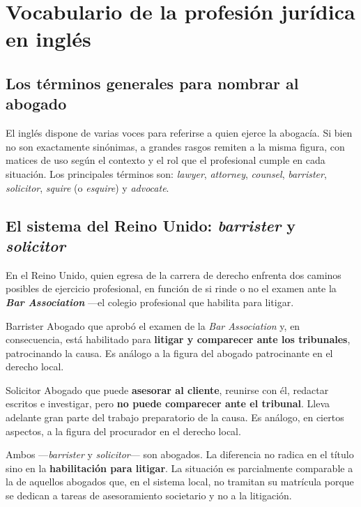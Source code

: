 \documentclass[12pt,oneside]{book}
\begin{document}
\chapter{Vocabulario de la profesión jurídica en inglés}

\section{Los términos generales para nombrar al abogado}

El inglés dispone de varias voces para referirse a quien ejerce la abogacía. Si bien no son exactamente sinónimas, a grandes rasgos remiten a la misma figura, con matices de uso según el contexto y el rol que el profesional cumple en cada situación. Los principales términos son: \textit{lawyer}, \textit{attorney}, \textit{counsel}, \textit{barrister}, \textit{solicitor}, \textit{squire} (o \textit{esquire}) y \textit{advocate}.

\section{El sistema del Reino Unido: \textit{barrister} y \textit{solicitor}}

En el Reino Unido, quien egresa de la carrera de derecho enfrenta dos caminos posibles de ejercicio profesional, en función de si rinde o no el examen ante la \textbf{\textit{Bar Association}} ---el colegio profesional que habilita para litigar.

\begin{definition}{Barrister}
Abogado que aprobó el examen de la \textit{Bar Association} y, en consecuencia, está habilitado para \textbf{litigar y comparecer ante los tribunales}, patrocinando la causa. Es análogo a la figura del abogado patrocinante en el derecho local.
\end{definition}

\begin{definition}{Solicitor}
Abogado que puede \textbf{asesorar al cliente}, reunirse con él, redactar escritos e investigar, pero \textbf{no puede comparecer ante el tribunal}. Lleva adelante gran parte del trabajo preparatorio de la causa. Es análogo, en ciertos aspectos, a la figura del procurador en el derecho local.
\end{definition}

\begin{important}
Ambos ---\textit{barrister} y \textit{solicitor}--- son abogados. La diferencia no radica en el título sino en la \textbf{habilitación para litigar}. La situación es parcialmente comparable a la de aquellos abogados que, en el sistema local, no tramitan su matrícula porque se dedican a tareas de asesoramiento societario y no a la litigación.
\end{important}
\end{document}

